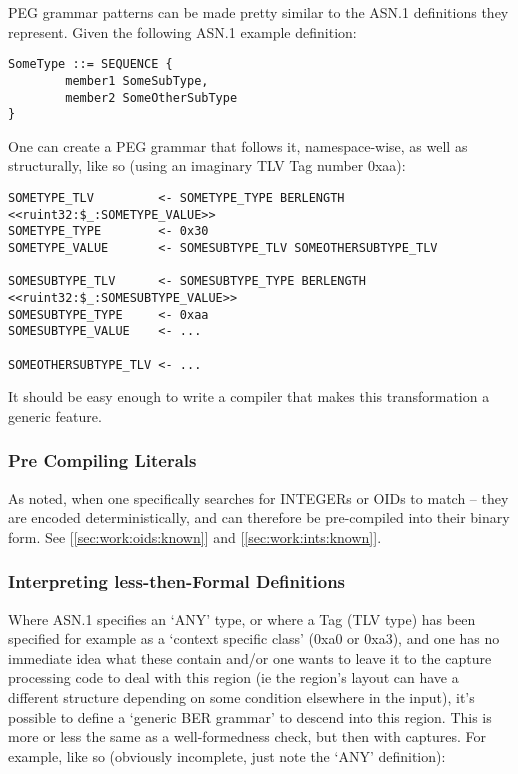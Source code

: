 PEG grammar patterns can be made pretty similar to the ASN.1 definitions 
they represent. Given the following ASN.1 example definition:

\begin{changemargin}{-60mm}{0mm}
\begin{myquote}
\begin{verbatim}
SomeType ::= SEQUENCE {
        member1 SomeSubType,
        member2 SomeOtherSubType
}
\end{verbatim}
\end{myquote}
\end{changemargin}

One can create a PEG grammar that follows it, namespace-wise, as well as 
structurally, like so (using an imaginary TLV Tag number 0xaa):

\begin{changemargin}{-60mm}{0mm}
\begin{myquote}
\begin{verbatim}
SOMETYPE_TLV         <- SOMETYPE_TYPE BERLENGTH <<ruint32:$_:SOMETYPE_VALUE>>
SOMETYPE_TYPE        <- 0x30
SOMETYPE_VALUE       <- SOMESUBTYPE_TLV SOMEOTHERSUBTYPE_TLV

SOMESUBTYPE_TLV      <- SOMESUBTYPE_TYPE BERLENGTH <<ruint32:$_:SOMESUBTYPE_VALUE>>
SOMESUBTYPE_TYPE     <- 0xaa
SOMESUBTYPE_VALUE    <- ... 

SOMEOTHERSUBTYPE_TLV <- ... 
\end{verbatim}
\end{myquote}
\end{changemargin}

It should be easy enough to write a compiler that makes this 
transformation a generic feature.

\subsubsection{Pre Compiling Literals}
As noted, when one specifically searches for INTEGERs or OIDs to match – 
they are encoded deterministically, and can therefore be pre-compiled into 
their binary form. See [\ref{sec:work:oids:known}]
and [\ref{sec:work:ints:known}].

\subsubsection{Interpreting less-then-Formal Definitions }
Where ASN.1 specifies an ‘ANY’ type, or where a Tag (TLV type) has 
been specified for example as a ‘context specific class’ (0xa0 or 
0xa3), and one has no immediate idea what these contain and/or one wants 
to leave it to the capture processing code to deal with this region (ie 
the region’s layout can have a different structure depending on some 
condition elsewhere in the input), it’s possible to define a ‘generic 
BER grammar’ to descend into this region. This is more or less the same 
as a well-formedness check, but then with captures. For example, like so 
(obviously incomplete, just note the ‘ANY’ definition):

